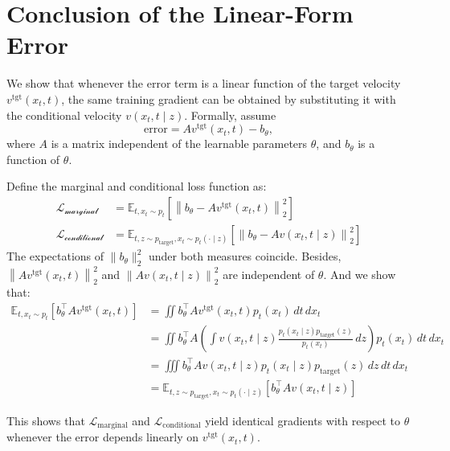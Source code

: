 \section{Conclusion of the Linear-Form Error}\label{app:linear_func}
We show that whenever the error term is a linear function of the target velocity $v^\text{tgt}(x_t,t)$, the same training gradient can be obtained by substituting it with the conditional velocity $v(x_t,t \mid z)$.
%
Formally, assume
\begin{equation*}
\text{error} = A v^\text{tgt}(x_t, t) - b_\theta,
\end{equation*}
%
where $A$ is a matrix independent of the learnable parameters $\theta$, and $b_\theta$ is a function of $\theta$.


Define the marginal and conditional loss function as:
%
\begin{align}
  \mathcal{L_\text{marginal}} &= \mathbb{E}_{t, x_t \sim p_t} \left[ \left\| b_\theta - A v^\text{tgt} (x_t, t) \right\|_2^2 \right] \\
  \mathcal{L_\text{conditional}} &=  \mathbb{E}_{t, z \sim p_\text{target}, x_t \sim p_t(\cdot \mid z)} \left[ \left\| b_\theta - A v (x_t, t \mid z) \right\|_2^2 \right]
\end{align}
%
The expectations of $\|b_\theta\|_2^2$ under both measures coincide.
%
Besides, $\left\| A v^\text{tgt} (x_t, t) \right\|_2^2$ and $\left\| A v (x_t, t \mid z) \right\|_2^2$ are independent of $\theta$.
%
And we show that:
%
\begin{align*}
\mathbb{E}_{t, x_t \sim p_t} \left[ b_\theta^\top A v^\text{tgt}(x_t, t) \right] &= \iint b_\theta^\top A v^\text{tgt}(x_t, t) p_t(x_t) \, dt \, dx_t \\
&= \iint b_\theta^\top A \left( \int v(x_t, t \mid z) \frac{p_t(x_t \mid z) p_\text{target}(z)}{p_t(x_t)} \, dz \right) p_t(x_t) \, dt \, dx_t \\
&= \iiint b_\theta^\top A v(x_t, t \mid z) p_t(x_t \mid z) p_\text{target}(z) \, dz \, dt \, dx_t \\
&= \mathbb{E}_{t, z \sim p_\text{target}, x_t \sim p_t(\cdot \mid z)} \left[ b_\theta^\top A v(x_t, t \mid z) \right]
\end{align*}

This shows that $\mathcal{L}_\text{marginal}$ and $\mathcal{L}_\text{conditional}$ yield identical gradients with respect to $\theta$ whenever the error depends linearly on $v^\text{tgt}(x_t,t)$.

